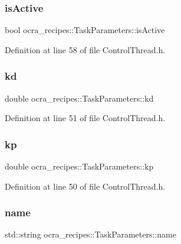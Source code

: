 \subsubsection{\texorpdfstring{is\+Active}{isActive}}
{\footnotesize\ttfamily bool ocra\+\_\+recipes\+::\+Task\+Parameters\+::is\+Active}



Definition at line 58 of file Control\+Thread.\+h.

\hypertarget{classocra__recipes_1_1TaskParameters_a8a90d9db17c0faeb26624899264eec9e}{}\label{classocra__recipes_1_1TaskParameters_a8a90d9db17c0faeb26624899264eec9e} 
\subsubsection{\texorpdfstring{kd}{kd}}
{\footnotesize\ttfamily double ocra\+\_\+recipes\+::\+Task\+Parameters\+::kd}



Definition at line 51 of file Control\+Thread.\+h.

\hypertarget{classocra__recipes_1_1TaskParameters_a644ed196f6bf867e46d7faab9ac287b3}{}\label{classocra__recipes_1_1TaskParameters_a644ed196f6bf867e46d7faab9ac287b3} 
\subsubsection{\texorpdfstring{kp}{kp}}
{\footnotesize\ttfamily double ocra\+\_\+recipes\+::\+Task\+Parameters\+::kp}



Definition at line 50 of file Control\+Thread.\+h.

\hypertarget{classocra__recipes_1_1TaskParameters_a8d9b23fed4d4207bed2b48625acb8910}{}\label{classocra__recipes_1_1TaskParameters_a8d9b23fed4d4207bed2b48625acb8910} 
\subsubsection{\texorpdfstring{name}{name}}
{\footnotesize\ttfamily std\+::string ocra\+\_\+recipes\+::\+Task\+Parameters\+::name}




